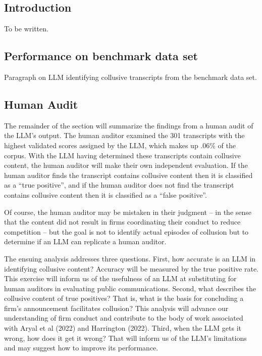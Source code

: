 
\subsection{Introduction}
To be written.

\subsection{Performance on benchmark data set}
Paragraph on LLM identifying collusive transcripts from the benchmark data set.

\subsection{Human Audit}
The remainder of the section will summarize the findings from a human audit of the LLM’s output. The human auditor examined the 301 transcripts with the highest validated scores assigned by the LLM, which makes up .06\% of the corpus. With the LLM having determined these transcripts contain collusive content, the human auditor will make their own independent evaluation. If the human auditor finds the transcript contains collusive content then it is classified as a ``true positive'', and if the human auditor does not find the transcript contains collusive content then it is classified as a ``false positive''. 

Of course, the human auditor may be mistaken in their judgment – in the sense that the content did not result in firms coordinating their conduct to reduce competition -- but the goal is not to identify actual episodes of collusion but to determine if an LLM can replicate a human auditor.

The ensuing analysis addresses three questions. First, how accurate is an LLM in identifying collusive content? Accuracy will be measured by the true positive rate. This exercise will inform us of the usefulness of an LLM at substituting for human auditors in evaluating public communications. Second, what describes the collusive content of true positives? That is, what is the basis for concluding a firm’s announcement facilitates collusion? This analysis will advance our understanding of firm conduct and contribute to the body of work associated with Aryal et al (2022) and Harrington (2022). Third, when the LLM gets it wrong, how does it get it wrong? That will inform us of the LLM’s limitations and may suggest how to improve its performance.

